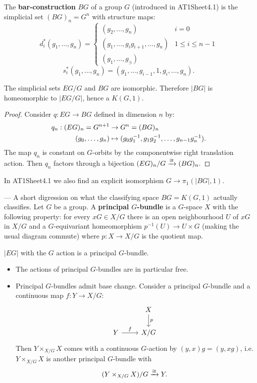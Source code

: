 \begin{remark}
The \textbf{bar-construction} $BG$ of a group $G$ (introduced in AT1Sheet4.1) is the simplicial set $(BG)_n=G^n$ with structure maps:
\[d^*_i(g_1,\dots,g_n)=\begin{cases}
(g_2,\dots,g_n) & i=0\\
(g_1,\dots,g_ig_{i+1},\dots,g_n) & 1\leq i\leq n-1\\
(g_1,\dots,g_\ni)
\end{cases}\]
\[s^*_i(g_1,\dots,g_n)=(g_1,\dots,g_{i-1},1,g_{i},\dots,g_n).\]

\begin{lemma}
The simplicial sets $EG/G$ and $BG$ are isomorphic. Therefore $|BG|$ is homeomorphic to $|EG/G|$, hence a $K(G,1)$.
\end{lemma}

\begin{proof}
Consider $q:EG\to BG$ defined in dimension $n$ by:
\begin{align*}
    q_n:(EG)_n=G^{n+1}&\to G^n=(BG)_n\\
    ({{g}_0,\dots,{g}_{n}})&\mapsto(g_0g_1^{-1},g_1g_2^{-1},\dots,g_{n-1} g_n^{-1}).
\end{align*}
The map $q_n$ is constant on $G$-orbits by the componentwise right translation action. Then $q_n$ factors through a bijection $(EG)_n/G\xrightarrow{\cong}(BG)_n.$
\end{proof}
\end{remark}

In AT1Sheet4.1 we also find an explicit isomorphism $G\to\pi_1(|BG|,1)$.

 --- A short digression on what the classifying space $BG=K(G,1)$ actually classifies. Let $G$ be a group. A \textbf{principal $G$-bundle} is a $G$-space $X$ with the following property: for every $xG\in X/G$ there is an open neighbourhood $U$ of $xG$ in $X/G$ and a $G$-equivariant homeomorphism $p^{-1}(U)\to U\times G$ (making the usual diagram commute) where $p:X\to X/G$ is the quotient map.

\begin{example}
$|EG|$ with the $G$ action is a principal $G$-bundle.
\end{example}

\begin{itemize}[label={-}]
    \item The actions of principal $G$-bundles are in particular free.
    \item Principal $G$-bundles admit base change. Consider a principal $G$-bundle and a continuous map $f:Y\to X/G$:
    \[\begin{tikzcd} & X \ar[d,"p"] \\
    Y \ar[r,"f"] & X/G\end{tikzcd}\]
    Then $Y\times_{X/G}X$ comes with a continuous $G$-action by $(y,x)g=(y,xg)$, i.e. $Y\times_{X/G}X$ is another principal $G$-bundle with \[(Y\times_{X/G}X)/G\xrightarrow{\cong} Y.\]
\end{itemize}

